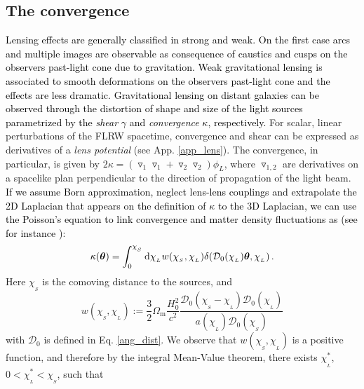 \documentclass[twocolumn,aps,reprint, nofootinbib]{revtex4}
\newcommand{\Omegam}{{\Omega_\mathrm{m}}}
\newcommand{\dd}{{\rm d}}
\newcommand{\bfth}{{\boldsymbol{\theta}}}
\newcommand{\mD}{{\mathcal{D}_0}}
\newcommand{\pr}[1]{{\textcolor{black}{\textit{} #1}}}
\begin{document}
\subsection{The convergence}


\pr{Lensing effects are generally classified in strong and weak. On the first case arcs and multiple images are observable as consequence of caustics and cusps on the observers past-light cone due to gravitation. Weak gravitational lensing is associated to smooth deformations on the observers past-light cone and the effects are less dramatic. Gravitational lensing on distant galaxies can be observed through  the distortion of shape and size of the light sources parametrized by the \emph{shear} $\gamma$ and \emph{convergence} $\kappa$, respectively. } For scalar, linear perturbations of the FLRW spacetime, convergence and shear can be expressed as derivatives of a \emph{lens potential} (see App. \ref{app_lens}).  The convergence, in particular, is given by $2 \kappa = (\triangledown_1 \triangledown_1 +  \triangledown_2 \triangledown_2) \phi_L$, where $\triangledown_{1, 2}$ are derivatives on a spacelike plan perpendicular to the direction of propagation of the light beam. \pr{If we assume Born approximation, neglect lens-lens couplings and extrapolate the 2D Laplacian that appears on the definition of $\kappa$ to the 3D Laplacian, we can use the Poisson's equation to link convergence and matter density fluctuations as (see for instance \cite{munshi2008cosmology})}:
\begin{equation}
\kappa(\bfth) =  \int_0^{\chi_{_S}} \dd \chi_{_L} w(\chi_{_S}, \chi_{_L}) \delta(\mD(\chi_{_L}) \bfth, \chi_{_L}) \, .
\end{equation}
Here $\chi_{_S}$ is the comoving distance to the sources, and
\begin{equation}
\label{w_definition}
w(\chi_{_S}, \chi_{_L}) := \frac{3}{2} \Omegam \frac{H_0^2}{c^2} \frac{\mD(\chi_{_S} - \chi_{_L}) \mD(\chi_{_L})}{a(\chi_{_L}) \mD(\chi_{_S})}
\end{equation} 
with $\mD$ is defined in Eq. \eqref{ang_dist}. We observe that $w(\chi_{_S}, \chi_{_L})$ is
 a positive function, and therefore by the integral Mean-Value theorem, there exists $\chi_{_L}^*$, $0 < \chi_{_L}^* < \chi_{_S}$, such that
\end{document}

